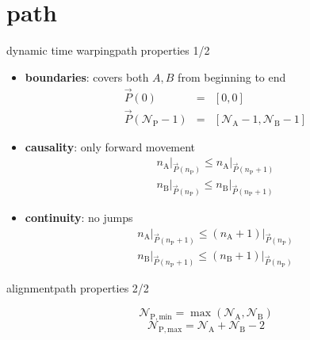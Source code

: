     \section[path]{path}
        \begin{frame}{dynamic time warping}{path properties 1/2}
            \begin{itemize}
                    \item	\textbf{boundaries}: covers both $A,B$ from beginning to end
                            \begin{eqnarray*}
                                \vec{P}(0) 		&=& [0, 0] \\
                                \vec{P}(\mathcal{N}_{\mathrm{P}}-1) 	&=& [\mathcal{N}_\mathrm{A}-1, \mathcal{N}_\mathrm{B}-1] 
                            \end{eqnarray*}
                    
                    \item<2->	\textbf{causality}: only forward movement
                            \begin{eqnarray*}
                                n_\mathrm{A}\big|_{\vec{P}(n_\mathrm{P})} \leq n_\mathrm{A}\big|_{\vec{P}(n_\mathrm{P}+1)} \\ 
                                n_\mathrm{B}\big|_{\vec{P}(n_\mathrm{P})} \leq n_\mathrm{B}\big|_{\vec{P}(n_\mathrm{P}+1)} 
                            \end{eqnarray*}
                    
                    \item<3->	\textbf{continuity}: no jumps
                            \begin{eqnarray*}
                                n_\mathrm{A}\big|_{\vec{P}(n_\mathrm{P}+1)} \leq (n_\mathrm{A}+1)\big|_{\vec{P}(n_\mathrm{P})} \\ 
                                n_\mathrm{B}\big|_{\vec{P}(n_\mathrm{P}+1)} \leq (n_\mathrm{B}+1)\big|_{\vec{P}(n_\mathrm{P})} 
                            \end{eqnarray*}
            \end{itemize}
        \end{frame}
        \begin{frame}{alignment}{path properties 2/2}
                \begin{figure}
                    
                \end{figure}

                    \begin{equation*}
                        \mathcal{N}_\mathrm{P, min} = \max(\mathcal{N}_\mathrm{A}, \mathcal{N}_\mathrm{B})
                    \end{equation*}
                    \begin{equation*}
                        \mathcal{N}_\mathrm{P, max} = \mathcal{N}_\mathrm{A} + \mathcal{N}_\mathrm{B} - 2
                    \end{equation*}
        \end{frame}
